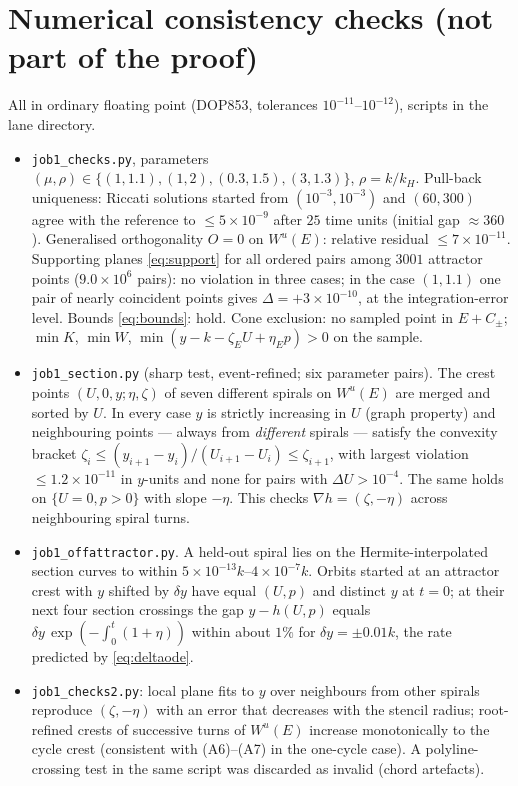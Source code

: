 \documentclass[11pt,a4paper]{article}
\numberwithin{equation}{section}
\theoremstyle{remark}\newtheorem{remark}[theorem]{Remark}
\begin{document}
\section{Numerical consistency checks (not part of the proof)}\label{sec:numerics}
All in ordinary floating point (DOP853, tolerances $10^{-11}$--$10^{-12}$), scripts in the lane directory.
\begin{itemize}
\item \texttt{job1\_checks.py}, parameters $(\mu,\rho)\in\{(1,1.1),(1,2),(0.3,1.5),(3,1.3)\}$, $\rho=k/k_H$.
Pull-back uniqueness: Riccati solutions started from $(10^{-3},10^{-3})$ and $(60,300)$ agree with the reference to
$\le5\times10^{-9}$ after $25$ time units (initial gap $\approx360$). Generalised orthogonality $O=0$ on
$W^u(E)$: relative residual $\le7\times10^{-11}$. Supporting planes \eqref{eq:support} for all ordered pairs among
$3001$ attractor points ($9.0\times10^6$ pairs): no violation in three cases; in the case $(1,1.1)$ one pair of
nearly coincident points gives $\Delta=+3\times10^{-10}$, at the integration-error level. Bounds
\eqref{eq:bounds}: hold. Cone exclusion: no sampled point in $E+C_\pm$; $\min K$, $\min W$,
$\min(y-k-\zeta_EU+\eta_Ep)>0$ on the sample.
\item \texttt{job1\_section.py} (sharp test, event-refined; six parameter pairs). The crest points
$(U,0,y;\eta,\zeta)$ of seven different spirals on $W^u(E)$ are merged and sorted by $U$. In every case $y$ is
strictly increasing in $U$ (graph property) and neighbouring points --- always from \emph{different} spirals ---
satisfy the convexity bracket $\zeta_i\le(y_{i+1}-y_i)/(U_{i+1}-U_i)\le\zeta_{i+1}$, with largest violation
$\le1.2\times10^{-11}$ in $y$-units and none for pairs with $\Delta U>10^{-4}$. The same holds on $\{U=0,p>0\}$
with slope $-\eta$. This checks $\nabla h=(\zeta,-\eta)$ across neighbouring spiral turns.
\item \texttt{job1\_offattractor.py}. A held-out spiral lies on the Hermite-interpolated section curves to within
$5\times10^{-13}k$--$4\times10^{-7}k$. Orbits started at an attractor crest with $y$ shifted by $\delta y$ have
equal $(U,p)$ and distinct $y$ at $t=0$; at their next four section crossings the gap $y-h(U,p)$ equals
$\delta y\,\exp(-\int_0^t(1+\eta))$ within about $1\%$ for $\delta y=\pm0.01k$, the rate predicted by
\eqref{eq:deltaode}.
\item \texttt{job1\_checks2.py}: local plane fits to $y$ over neighbours from other spirals reproduce
$(\zeta,-\eta)$ with an error that decreases with the stencil radius; root-refined crests of successive turns of
$W^u(E)$ increase monotonically to the cycle crest (consistent with (A6)--(A7) in the one-cycle case). A
polyline-crossing test in the same script was discarded as invalid (chord artefacts).
\end{itemize}
\end{document}
